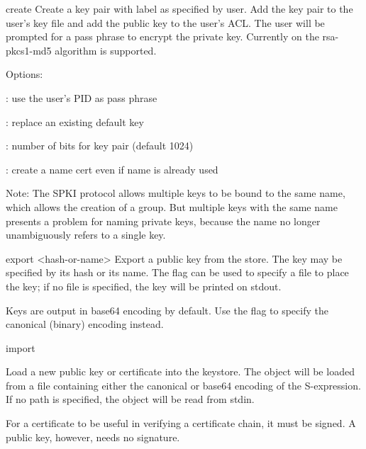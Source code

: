 \documentclass{howto}
\begin{document}
\begin{datadescni}{create  
        }
    Create a key pair with label as specified by user.  Add the key
    pair to the user's key file and add the public key to the user's
    ACL.  The user will be prompted for a pass phrase to encrypt the
    private key.  Currently on the rsa-pkcs1-md5 algorithm is
    supported.

    Options:

    \programopt{-}: use the user's PID as pass
phrase

    \programopt{-}: replace an existing default
key

    : number of bits for key pair (default 1024)

    \programopt{-}: create a name cert even if name is already used

    Note: The SPKI protocol allows multiple keys to be bound to the
    same name, which allows the creation of a group.  But multiple
    keys with the same name presents a problem for naming private
    keys, because the name no longer unambiguously refers to a single
    key. 
\end{datadescni}    

\begin{datadescni}{export   <hash-or-name>}
    Export a public key from the store.  The key may be specified by
    its hash or its name.  The  flag can be used to
    specify a file to place the key; if no file is specified, the key
    will be printed on stdout.

    Keys are output in base64 encoding by default.  Use the
    \programopt{-} flag to specify the
    canonical (binary) encoding instead. 
\end{datadescni}

\begin{datadescni}{import }

    Load a new public key or certificate into the keystore.  The
    object will be loaded from a file containing either the canonical
    or base64 encoding of the S-expression.  If no path is specified,
    the object will be read from stdin.

    For a certificate to be useful in verifying a certificate chain,
    it must be signed.  A public key, however, needs no signature.
\end{datadescni}
\end{document}
